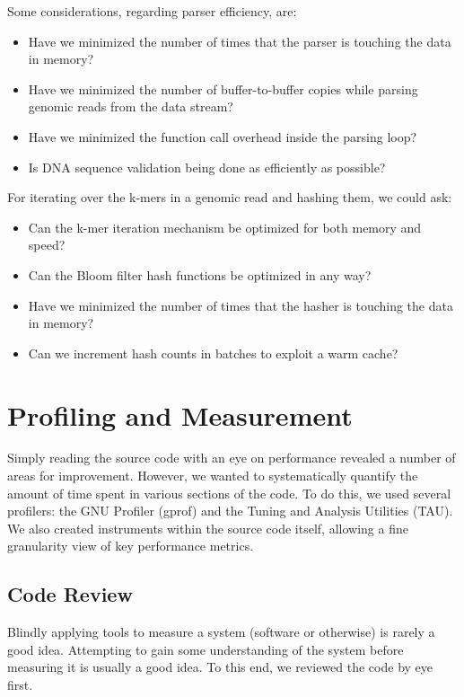 \documentclass{article}
\begin{document}
Some considerations, regarding parser efficiency, are:
\begin{itemize}
\item Have we minimized the number of times that the parser is touching the 
data in memory?
\item Have we minimized the number of buffer-to-buffer copies while parsing 
genomic reads from the data stream?
\item Have we minimized the function call overhead inside the parsing loop?
\item Is DNA sequence validation being done as efficiently as possible?
\end{itemize}

For iterating over the k-mers in a genomic read and hashing them, we could ask:
\begin{itemize}
\item Can the k-mer iteration mechanism be optimized for both memory and speed?
\item Can the Bloom filter hash functions be optimized in any way?
\item Have we minimized the number of times that the hasher is touching the 
data in memory?
\item Can we increment hash counts in batches to exploit a warm cache?
\end{itemize}

\section{Profiling and Measurement}

Simply reading the source code with an eye on performance revealed a number of
areas for improvement. However, we wanted to systematically quantify the amount
of time spent in various sections of the code. To do this, we used several
profilers: the GNU Profiler (gprof) and the Tuning and Analysis Utilities
(TAU). We also created instruments within the source code itself, allowing a
fine granularity view of key performance metrics.

\subsection{Code Review}

Blindly applying tools to measure a system (software or otherwise) is rarely a
good idea. Attempting to gain some understanding of the system before measuring
it is usually a good idea. To this end, we reviewed the code by eye first.
\end{document}
